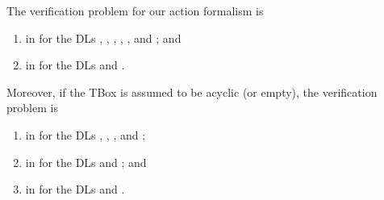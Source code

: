\begin{theorem}\label{thm:verification-complexity}
    The verification problem for our action formalism is
    \begin{enumerate}
        \item\label{enum:verification-tbox-alcqo}
            in \TwoExpTime for the DLs \ALC, \ALCO, \ALCI, \ALCIO, \ALCQ, and
            \ALCQO; and
        \item\label{enum:verification-tbox-alcqio}
            in \coTwoNExpTime for the DLs \ALCQI and \ALCQIO.
    \end{enumerate}
    Moreover, if the TBox is assumed to be acyclic (or empty), the verification
    problem is
    \begin{enumerate}[resume]
        \item\label{enum:verification-alcqo}
            in \ExpSpace for the DLs \ALC, \ALCO, \ALCQ, and \ALCQO;
        \item\label{enum:verification-alcio}
            in \TwoExpTime for the DLs \ALCI and \ALCIO; and
        \item\label{enum:verification-alcqio}
            in \coTwoNExpTime for the DLs \ALCQI and \ALCQIO.
    \end{enumerate}
\end{theorem}

